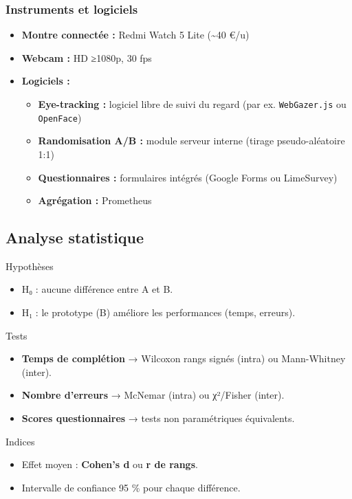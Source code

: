 \documentclass[a4paper,12pt]{article}
\begin{document}
\subsubsection{Instruments et logiciels}
\label{sec:org3ab2114}
\begin{itemize}
\item \textbf{\textbf{Montre connectée :}} Redmi Watch 5 Lite (\textasciitilde{}40 €/u)
\item \textbf{\textbf{Webcam :}} HD ≥1080p, 30 fps
\item \textbf{\textbf{Logiciels :}}
\begin{itemize}
\item \textbf{Eye-tracking :} logiciel libre de suivi du regard (par ex. \texttt{WebGazer.js} ou \texttt{OpenFace})
\item \textbf{Randomisation A/B :} module serveur interne (tirage pseudo-aléatoire 1:1)
\item \textbf{Questionnaires :} formulaires intégrés (Google Forms ou LimeSurvey)
\item \textbf{Agrégation :} Prometheus
\end{itemize}
\end{itemize}
\subsection{Analyse statistique}
\label{sec:org5e4239a}
Hypothèses
\begin{itemize}
\item H₀ : aucune différence entre A et B.
\item H₁ : le prototype (B) améliore les performances (temps, erreurs).
\end{itemize}

Tests
\begin{itemize}
\item \textbf{Temps de complétion} → Wilcoxon rangs signés (intra) ou Mann-Whitney (inter).
\item \textbf{Nombre d’erreurs} → McNemar (intra) ou χ²/Fisher (inter).
\item \textbf{Scores questionnaires} → tests non paramétriques équivalents.
\end{itemize}

Indices
\begin{itemize}
\item Effet moyen : \textbf{Cohen’s d} ou \textbf{r de rangs}.
\item Intervalle de confiance 95 \% pour chaque différence.
\end{itemize}
\end{document}
